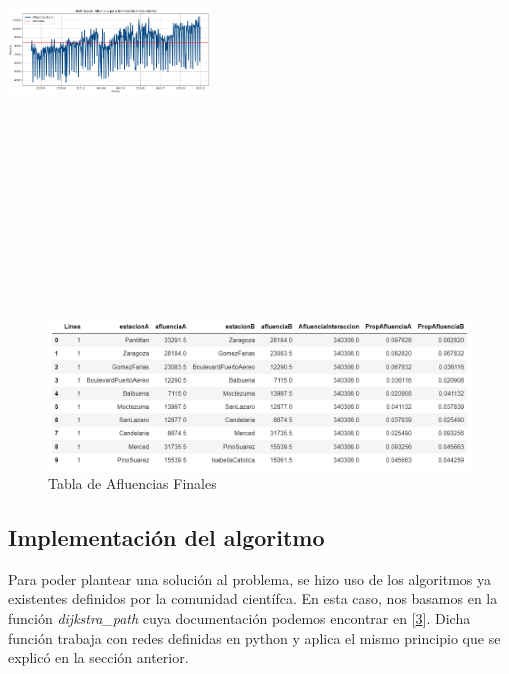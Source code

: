 \documentclass[
]{article}
\begin{document}
\includegraphics[width=0.4\textwidth,height=5.20833in]{Imagenes/IndiosVerdesMediana.png}

\begin{figure}
\centering
\includegraphics{Imagenes/AfluenciasTable.png}
\caption{Tabla de Afluencias Finales}
\end{figure}

\hypertarget{implementaciuxf3n-del-algoritmo}{%
\subsection{Implementación del
algoritmo}\label{implementaciuxf3n-del-algoritmo}}

Para poder plantear una solución al problema, se hizo uso de los
algoritmos ya existentes definidos por la comunidad científca. En esta
caso, nos basamos en la función \emph{dijkstra\_path} cuya documentación
podemos encontrar en
{[}\protect\hyperlink{ref-noauthor_dijkstra_path_nodate}{3}{]}. Dicha
función trabaja con redes definidas en python y aplica el mismo
principio que se explicó en la sección anterior.
\end{document}
